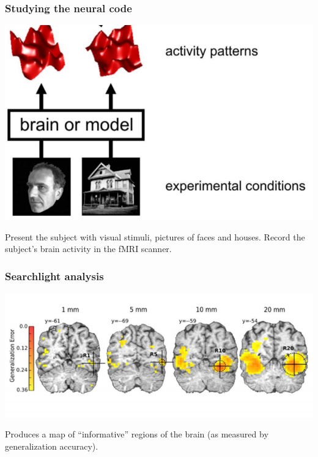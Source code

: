 \documentclass{beamer}
\begin{document}
\begin{frame}
\sectionpage
\end{frame}

\begin{frame}
\frametitle{Studying the neural code}
\begin{center}
\includegraphics[scale = 0.3]{k08_step1.png}
\end{center}
Present the subject with visual stimuli, pictures of faces and houses.
Record the subject's brain activity in the fMRI scanner.
\end{frame}

%
{

}

\begin{frame}
\frametitle{Searchlight analysis}
\begin{center}
\includegraphics[scale = 0.5]{searchlight_windowsize.png}
\end{center}
Produces a map of ``informative'' regions of the brain (as measured by generalization accuracy).
\end{frame}

{

}
\end{document}
